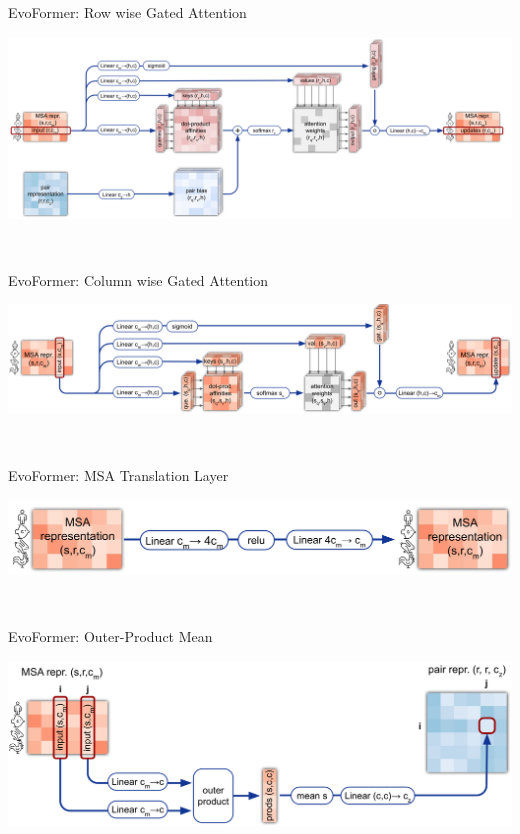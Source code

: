 \documentclass[presentation, smaller]{beamer}
\begin{document}
\begin{frame}[label={sec:orgcb1235a}]{EvoFormer: Row wise Gated Attention}
\begin{center}
\includegraphics[width=.9\linewidth]{./imgs/rowwise-gated-attention.png}
\end{center}~\cite{jumperHighlyAccurateProtein2021}
\end{frame}

\begin{frame}[label={sec:orgc40bd97}]{EvoFormer: Column wise Gated Attention}
\begin{center}
\includegraphics[width=.9\linewidth]{./imgs/columnwise-gated-attention.png}
\end{center}~\cite{jumperHighlyAccurateProtein2021}
\end{frame}

\begin{frame}[label={sec:orgff0da82}]{EvoFormer: MSA Translation Layer}
\begin{center}
\includegraphics[width=.9\linewidth]{./imgs/msa-translation-layer.png}
\end{center}~\cite{jumperHighlyAccurateProtein2021}
\end{frame}

\begin{frame}[label={sec:org20a1149}]{EvoFormer: Outer-Product Mean}
\begin{center}
\includegraphics[width=.9\linewidth]{./imgs/outer-product-mean.png}
\end{center}~\cite{jumperHighlyAccurateProtein2021}
\end{frame}
\end{document}

